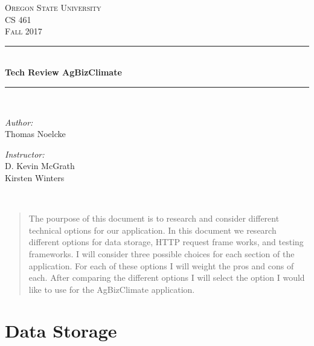 \documentclass[letterpaper,10pt]{article}
\begin{document}
    \begin{titlepage}
    \newcommand{\HRule}{\rule{\linewidth}{0.5mm}}
    \center
    \textsc{\Large Oregon State University}\\[1.5cm]
    \textsc{\Large CS 461}\\[0.5cm]
    \textsc{\Large Fall 2017}\\[0.5cm]
    \HRule \\[0.4cm]
    { \huge \bfseries Tech Review AgBizClimate}\\[0.4cm] %
    \HRule \\[1.5cm]
    \begin{minipage}{0.4\textwidth}
        \begin{flushleft} \large
        \emph{Author:}\\
        Thomas Noelcke
        \end{flushleft}
    \end{minipage}
    \begin{minipage}{0.4\textwidth}
        \begin{flushright} \large
        \emph{Instructor:} \\
        D. Kevin McGrath\\
        Kirsten Winters
        \end{flushright}
    \end{minipage}\\[2cm]
    \begin{abstract}
    \item 
		The pourpose of this document is to research and consider different technical options for our application. In this document we research different options for data storage, HTTP request frame works, and testing frameworks. I will consider three possible choices for each section of the application. For each of these options I will weight the pros and cons of each. After comparing the different options I will select the option I would like to use for the AgBizClimate application.
    \end{abstract}
    \vfill %
    \end{titlepage}
		
\section{Data Storage}
\end{document}
